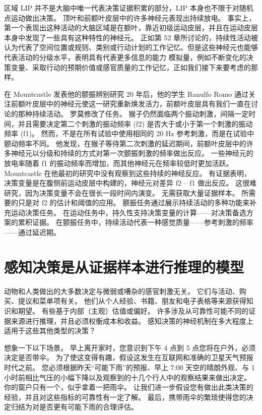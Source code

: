 区域 LIP 并不是大脑中唯一代表决策证据积累的部分，LIP 本身也不限于对随机点运动做出决策。 顶叶和前额叶皮层中的许多神经元表现出持续放电。 事实上，第一个表现出这种活动的大脑区域是在额叶，靠近初级运动皮层，并且在运动皮层本身中发现了一些具有这种特性的神经元。 正如第 52 章所讨论的，持续性活动被认为代表了空间位置或规则、类别或行动计划的工作记忆。但是这些神经元也能够代表活动的分级水平，表明具有代表更多信息的能力 模拟量，例如不断变化的决策变量、采取行动的预期价值或感官质量的工作记忆，正如我们接下来要考虑的那样。

在 Mountcastle 发表他的颤振辨别研究 20 年后，他的学生 Ranulfo Romo 通过关注前额叶皮层中的神经元使这一研究重新焕发活力，前额叶皮层具有我们一直在讨论的那种持续活动。 罗莫修改了任务。 猴子仍然面临两个振动刺激，间隔一定时间，并且需要决定第二个刺激的振动频率 (f2) 是否大于或小于第一个刺激的振动频率 (f1)。 然而，不是在所有试验中使用相同的 20 Hz 参考刺激，而是在试验中颤动频率不同。 他发现，在猴子等待第二次刺激的延迟期间，前额叶皮层中的许多神经元以分级和持续的方式对第一次颤振刺激的频率做出反应。 一些神经元的放电率随着 f1 的振动频率而增加，而其他神经元在频率较低时更加活跃。 Mountcastle 在他最初的研究中没有观察到这些持续的神经反应。 有证据表明，决策变量是在腹侧前运动皮层中构建的，神经元对差异 f2 – f1 做出反应。 这很难研究，因为决策变量不会在很长一段时间内演变。 无需获取大量证据样本。 所需要的只是对 f2 的估计和阈值的应用。 颤振任务通过展示持续活动的多种功能来补充运动决策任务。 在运动任务中，持久性支持决策变量的计算——对决策备选方案的累积证据。 在颤振任务中，持续活动代表一种感觉质量——参考刺激的频率——通过延迟期。


\section{感知决策是从证据样本进行推理的模型}

动物和人类做出的大多数决定与微弱或嘈杂的感官刺激无关。 它们与活动、购买、提议和菜单项有关。 他们从个人经验、书籍、朋友和电子表格等来源获得知识和期望。 有些基于内部（主观）估值或偏好。 许多涉及从可靠性可能不同的证据来源进行推理，并且必须权衡成本和收益。 感知决策的神经机制在多大程度上适用于这些其他类型的决策？

想象一下以下场景。 早上离开家时，您意识到下午 4 点到 5 点您将在户外，必须决定是否带伞。 为了使这变得有趣，假设这发生在互联网和准确的卫星天气预报时代之前。 您必须根据昨天“可能下雨”的预报、早上 7:00 天空的晴朗外观、与 1 小时前相比气压的小幅下降以及观察到的十几个行人中的观察结果来做出决定。 你的窗户只有一个，似乎拿着一把雨伞。 让我们进一步假设您有做出此类决策的经验，并且对这些指标的可靠性有一定了解。 最后，携带雨伞的繁琐使得您的决定归结为对是否更有可能下雨的合理评估。

